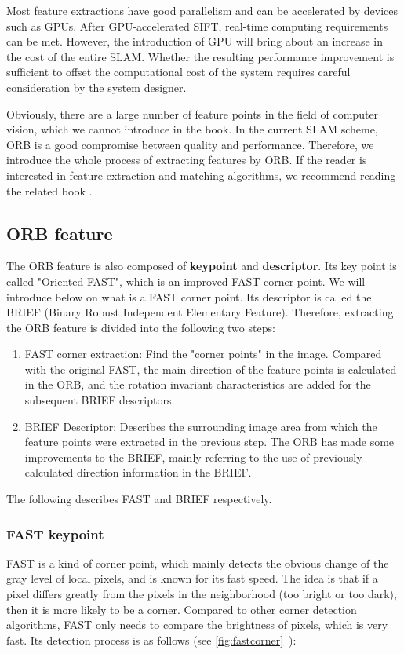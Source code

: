 Most feature extractions have good parallelism and can be accelerated by devices such as GPUs. After GPU-accelerated SIFT, real-time computing requirements can be met. However, the introduction of GPU will bring about an increase in the cost of the entire SLAM. Whether the resulting performance improvement is sufficient to offset the computational cost of the system requires careful consideration by the system designer.

Obviously, there are a large number of feature points in the field of computer vision, which we cannot introduce in the book. In the current SLAM scheme, ORB is a good compromise between quality and performance. Therefore, we introduce the whole process of extracting features by ORB. If the reader is interested in feature extraction and matching algorithms, we recommend reading the related book \cite{Nixon2012}.
\subsection{ORB feature}

The ORB feature is also composed of \textbf{keypoint} and \textbf{descriptor}. Its key point is called "Oriented FAST", which is an improved FAST corner point. We will introduce below on what is a FAST corner point. Its descriptor is called the BRIEF (Binary Robust Independent Elementary Feature). Therefore, extracting the ORB feature is divided into the following two steps:
\begin{enumerate}
\item FAST corner extraction: Find the "corner points" in the image. Compared with the original FAST, the main direction of the feature points is calculated in the ORB, and the rotation invariant characteristics are added for the subsequent BRIEF descriptors.
\item BRIEF Descriptor: Describes the surrounding image area from which the feature points were extracted in the previous step. The ORB has made some improvements to the BRIEF, mainly referring to the use of previously calculated direction information in the BRIEF.
\end{enumerate}

The following describes FAST and BRIEF respectively.
\subsubsection{FAST keypoint}

FAST is a kind of corner point, which mainly detects the obvious change of the gray level of local pixels, and is known for its fast speed. The idea is that if a pixel differs greatly from the pixels in the neighborhood (too bright or too dark), then it is more likely to be a corner. Compared to other corner detection algorithms, FAST only needs to compare the brightness of pixels, which is very fast. Its detection process is as follows (see \autoref{fig:fastcorner}~):

